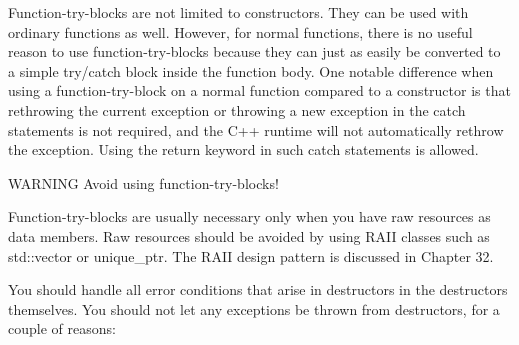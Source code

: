 Function-try-blocks are not limited to constructors. They can be used with ordinary functions as well. However, for normal functions, there is no useful reason to use function-try-blocks because they can just as easily be converted to a simple try/catch block inside the function body. One notable difference when using a function-try-block on a normal function compared to a constructor is that rethrowing the current exception or throwing a new exception in the catch statements is not required, and the C++ runtime will not automatically rethrow the exception. Using the return keyword in such catch statements is allowed.

\begin{myWarning}{WARNING}
Avoid using function-try-blocks!

Function-try-blocks are usually necessary only when you have raw resources as data members. Raw resources should be avoided by using RAII classes such as std::vector or unique\_ptr. The RAII design pattern is discussed in Chapter 32.
\end{myWarning}


You should handle all error conditions that arise in destructors in the destructors themselves. You should not let any exceptions be thrown from destructors, for a couple of reasons:

